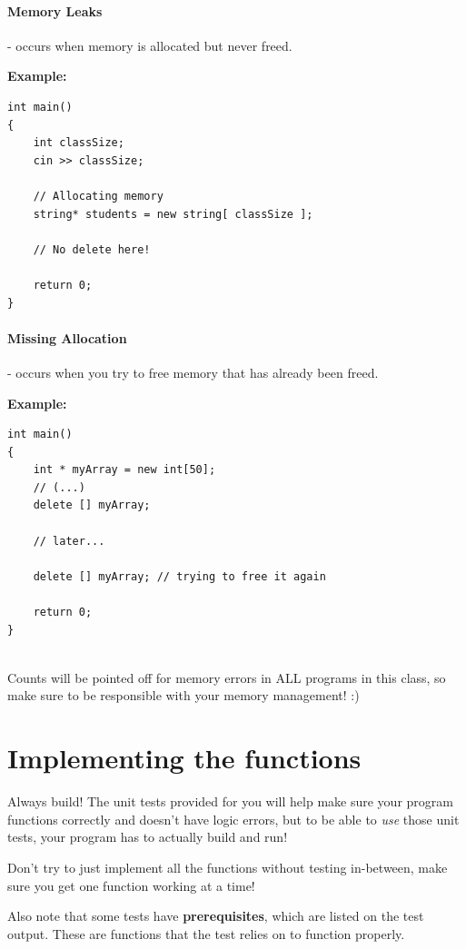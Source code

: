 \documentclass[a4paper,12pt]{book}
\begin{document}
        \paragraph{Memory Leaks} - occurs when memory is allocated
        but never freed.
        
        \textbf{Example:}

\begin{lstlisting}[style=code]
int main()
{
    int classSize;
    cin >> classSize;

    // Allocating memory
    string* students = new string[ classSize ];

    // No delete here!

    return 0;
}
\end{lstlisting}

        \paragraph{Missing Allocation} - occurs when you try to free
        memory that has already been freed.

        \textbf{Example:}

\begin{lstlisting}[style=code]
int main()
{
    int * myArray = new int[50];
    // (...)
    delete [] myArray;

    // later...

    delete [] myArray; // trying to free it again

    return 0;
}
\end{lstlisting}

        ~\\

        Counts will be pointed off for memory errors in ALL programs
        in this class, so make sure to be responsible with your memory management! :)

\newpage
    \section*{Implementing the functions}

        \begin{error}{Always build!}
            The unit tests provided for you will help make sure your program
            functions correctly and doesn't have logic errors, but to
            be able to \textit{use} those unit tests, your program has to
            actually build and run!

            Don't try to just implement all the functions without testing in-between,
            make sure you get one function working at a time!

            Also note that some tests have \textbf{prerequisites},
            which are listed on the test output. These are functions that
            the test relies on to function properly.
        \end{error}
\end{document}
